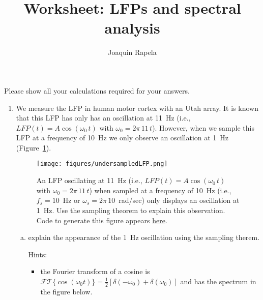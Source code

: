 \documentclass[12pt]{article}
\title{Worksheet: LFPs and spectral analysis}
\author{Joaquin Rapela}
\begin{document}
\maketitle

Please show all your calculations required for your answers.

\begin{enumerate}

    \item We measure the LFP in human motor cortex with an Utah array. It is
        known that this LFP has only has an oscillation at 11~Hz (i.e.,
        $LFP(t)=A \cos(\omega_0\,t)$ with $\omega_0=2\pi\,11\,t$). However, when
        we sample this LFP at a frequency of 10~Hz we only observe an oscillation
        at 1~Hz (Figure~\ref{fig:undersampledLFP}).

        \begin{figure}
            \begin{center}
                \texttt{[image: figures/undersampledLFP.png]}

                \caption{An LFP oscillating at 11~Hz (i.e., $LFP(t)=A
                \cos(\omega_0\,t)$ with $\omega_0=2\pi\,11\,t$) when sampled at
                a frequency of 10~Hz (i.e., $f_s=10$~Hz or
                $\omega_s=2\pi\,10$~rad/sec) only displays an oscillation at
                1~Hz. Use the sampling theorem to explain this observation.
                Code to generate this figure appears \href{}{here}.}

            \end{center}
            \label{fig:undersampledLFP}
        \end{figure}

        \begin{enumerate}[(a)]

            \item explain the appearance of the 1~Hz oscillation using the
                sampling therem.

                Hints:

                \begin{itemize}

                    \item the Fourier transform of a cosine is
                        $\mathcal{FT}\{\cos(\omega_0
                        t)\}=\frac{1}{2}[\delta(-\omega_0)+\delta(\omega_0)]$
                        and has the spectrum in the figure below.
                        


\end{itemize}
\end{enumerate}
\end{enumerate}
\end{document}
